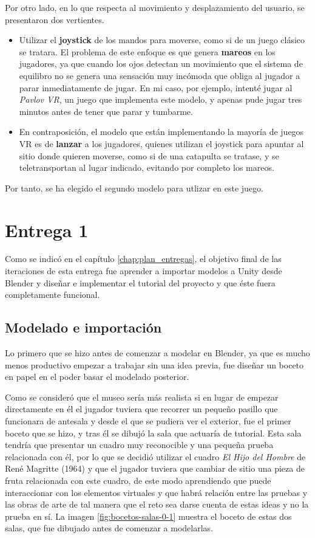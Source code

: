Por otro lado, en lo que respecta al movimiento y desplazamiento del usuario, se presentaron dos vertientes.

\begin{itemize}
    \item Utilizar el \textbf{joystick} de los mandos para moverse, como si de un juego clásico se tratara. El problema de este enfoque es que genera \textbf{mareos} en los jugadores, ya que cuando los ojos detectan un movimiento que el sistema de equilibro no se genera una sensación muy incómoda que obliga al jugador a parar inmediatamente de jugar. En mi caso, por ejemplo, intenté jugar al \textit{Pavlov VR}, un juego que implementa este modelo, y apenas pude jugar tres minutos antes de tener que parar y tumbarme.
    
    \item En contraposición, el modelo que están implementando la mayoría de juegos \acs{VR} es de \textbf{lanzar} a los jugadores, quienes utilizan el joystick para apuntar al sitio donde quieren moverse, como si de una catapulta se tratase, y se teletransportan al lugar indicado, evitando por completo los mareos. 
\end{itemize}

Por tanto, se ha elegido el segundo modelo para utlizar en este juego.

\section{Entrega 1}

Como se indicó en el capítulo \ref{chap:plan_entregas}, el objetivo final de las iteraciones de esta entrega fue aprender a importar modelos a Unity desde Blender y diseñar e implementar el tutorial del proyecto y que éste fuera completamente funcional. 

\subsection{Modelado e importación}

Lo primero que se hizo antes de comenzar a modelar en Blender, ya que es mucho menos productivo empezar a trabajar sin una idea previa, fue diseñar un boceto en papel en el poder basar el modelado posterior.

Como se consideró que el museo sería más realista si en lugar de empezar directamente en él el jugador tuviera que recorrer un pequeño pasillo que funcionara de antesala y desde el que se pudiera ver el exterior, fue el primer boceto que se hizo, y tras él se dibujó la sala que actuaría de tutorial. Esta sala tendría que presentar un cuadro muy reconocible y una pequeña prueba relacionada con él, por lo que se decidió utilizar el cuadro \textit{El Hijo del Hombre} de René Magritte (1964) y que el jugador tuviera que cambiar de sitio una pieza de fruta relacionada con este cuadro, de este modo aprendiendo que puede interaccionar con los elementos virtuales y que habrá relación entre las pruebas y las obras de arte de tal manera que el reto sea darse cuenta de estas ideas y no la prueba en sí. La imagen \ref{fig:bocetos-salas-0-1} muestra el boceto de estas dos salas, que fue dibujado antes de comenzar a modelarlas.

